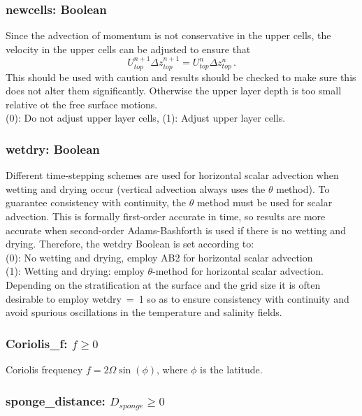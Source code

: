 \subsubsection{newcells: Boolean}

Since the advection of momentum is not conservative in the upper cells, the velocity in the upper cells
can be adjusted to ensure that
\[
U_{top}^{n+1}\Delta z_{top}^{n+1} = 
U_{top}^{n}\Delta z_{top}^{n}\,.
\]
This should be used with caution and results should be checked to make sure this does not alter them
significantly.  Otherwise the upper layer depth is too small relative ot the free surface motions.\\
(0): Do not adjust upper layer cells, (1): Adjust upper layer cells.

\subsubsection{wetdry: Boolean}

Different time-stepping schemes are used for horizontal scalar advection when wetting and drying occur (vertical
advection always uses the $\theta$ method).  To guarantee consistency
with continuity, the $\theta$ method must be used for scalar advection.  This is formally first-order
accurate in time, so results are more accurate when second-order Adams-Bashforth is used if there
is no wetting and drying.  Therefore, the wetdry Boolean is set according to:\\
(0): No wetting and drying, employ AB2 for horizontal scalar advection\\
(1): Wetting and drying: employ $\theta$-method for horizontal scalar advection.\\
Depending on the stratification at the surface and the grid size it is often desirable to employ
\mbox{wetdry = 1} so as to ensure consistency with continuity and avoid spurious oscillations in
the temperature and salinity fields.

\subsubsection{Coriolis\_f: $f\ge 0$}

Coriolis frequency $f=2\Omega\sin(\phi)$, where $\phi$ is the latitude.

\subsubsection{sponge\_distance: $D_{sponge}\ge 0$}

